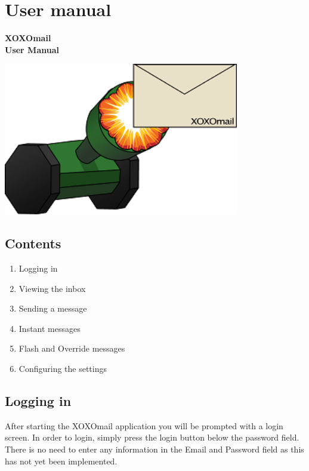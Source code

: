\chapter{User manual}


   \begin{center}
    \vspace*{3\baselineskip}
    \large
    \bfseries
    XOXOmail\\[2\baselineskip]
    
    User Manual \\
    \normalfont
    \large
    
    	
    \includegraphics[height=18em]{login_screen}
  \end{center}

\newpage

\section*{Contents}
\begin{enumerate}
\item{}Logging in
\item{}Viewing the inbox
\item{}Sending a message
\item{}Instant messages
\item{}Flash and Override messages
\item{}Configuring the settings
\end{enumerate}


\newpage
\section*{Logging in}

After starting the XOXOmail application you will be prompted with a login screen. In order to login, simply press the login button below the password field. There is no need to enter any information in the Email and Password field as this has not yet been implemented. 

